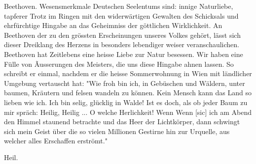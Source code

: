 \def\day{3.8.1942}
\mktitle

Beethoven.
Wesensmerkmale Deutschen Seelentums sind: innige Naturliebe, tapferer Trotz im Ringen mit den widerw\"{a}rtigen Gewalten des Schicksals und ehrf\"{u}rchtige Hingabe an das Geheimniss der g\"{o}ttlichen Wirklichkeit.
An Beethoven der zu den gr\"{o}ssten Erscheinungen unseres Volkes geh\"{o}rt, l\"{a}sst sich dieser Dreiklang des Herzens in besonders lebendiger weiser veranschaulichen.
Beethoven hat Zeitlebens eine heisse Liebe zur Natur besessen.
Wir haben eine F\"{u}lle von Ãusserungen des Meisters, die uns diese Hingabe ahnen lassen.
So schreibt er einmal, nachdem er die heisse Sommerwohnung in Wien mit l\"{a}ndlicher Umgebung vertauscht hat:
"Wie froh bin ich, in Geb\"{u}schen und W\"{a}ldern, unter baumen, Kr\"{a}utern und felsen wandeln zu k\"{o}nnen.
Kein Mensch kann das Land so lieben wie ich.
Ich bin selig, gl\"{u}cklig in Walde!
Ist es doch, als ob jeder Baum zu mir spr\"{a}ch: Heilig, Heilig ... O welche Herlichkeit!
Wenn Wenn {\color{red} [sic] } ich am Abend den Himmel staunend betrachte und das Heer der Lichtk\"{o}rper, dann schwingt sich mein Geist \"{u}ber die so vielen Millionen Gestirne hin zur Urquelle, aus welcher alles Erschaffen erstr\"{o}mt."

Heil.

\clearpage
